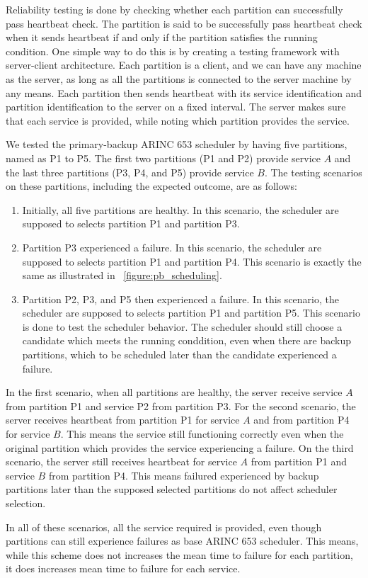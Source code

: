 Reliability testing is done by checking whether each partition can successfully pass heartbeat
check. The partition is said to be successfully pass heartbeat check when it sends heartbeat if
and only if the partition satisfies the running condition. One simple way to do this is by
creating a testing framework with server-client architecture. Each partition is a client, and we
can have any machine as the server, as long as all the partitions is connected to the server
machine by any means. Each partition then sends heartbeat with its service identification and
partition identification to the server on a fixed interval. The server makes sure that each
service is provided, while noting which partition provides the service.

We tested the primary-backup ARINC 653 scheduler by having five partitions, named as P1 to P5.
The first two partitions (P1 and P2) provide service $A$ and the last three partitions (P3, P4,
and P5) provide service $B$. The testing scenarios on these partitions, including the expected
outcome, are as follows:

\begin{enumerate}
	\item Initially, all five partitions are healthy. In this scenario, the scheduler are
		supposed to selects partition P1 and partition P3.

	\item Partition P3 experienced a failure. In this scenario, the scheduler are supposed
		to selects partition P1 and partition P4. This scenario is exactly the same as
		illustrated in \figurename ~\ref{figure:pb_scheduling}.

	\item Partition P2, P3, and P5 then experienced a failure. In this scenario, the
		scheduler are supposed to selects partition P1 and partition P5. This scenario is
		done to test the scheduler behavior. The scheduler should still choose a
		candidate which meets the running conddition, even when there are backup
		partitions, which to be scheduled later than the candidate experienced a
		failure. 
\end{enumerate}

In the first scenario, when all partitions are healthy, the server receive service $A$ from
partition P1 and service P2 from partition P3. For the second scenario, the server receives
heartbeat from partition P1 for service $A$ and from partition P4 for service $B$. This means
the service still functioning correctly even when the original partition which provides the
service experiencing a failure. On the third scenario, the server still receives heartbeat for
service $A$ from partition P1 and service $B$ from partition P4. This means failured experienced
by backup partitions later than the supposed selected partitions do not affect scheduler
selection.

In all of these scenarios, all the service required is provided, even though partitions can
still experience failures as base ARINC 653 scheduler. This means, while this scheme does not
increases the mean time to failure for each partition, it does increases mean time to failure
for each service. 

